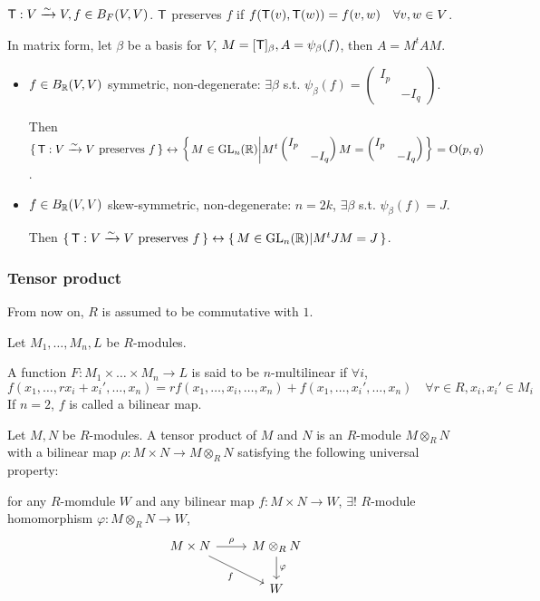 ${\sf T}: V \xrightarrow{\sim} V, f\in B_F(V, V)$.
${\sf T}$ preserves $f$ if $f({\sf T}(v), {\sf T}(w)) = f(v, w) \quad
\forall v,w \in V$.

In matrix form, let $\beta$ be a basis for $V$,
$M =[{\sf T}]_\beta, A = \psi_\beta(f)$, then $A = M^tAM$.

\begin{itemize}
  \item $f \in B_{\mathbb{R}}(V,V)$ symmetric, non-degenerate:
    $\exists \beta$ s.t. $\psi_\beta(f) = \begin{pmatrix}I_p \\ & -I_q\end{pmatrix}$.

    Then $\{\, {\sf T}: V \xrightarrow{\sim} V \text{~preserves~} f \,\} \leftrightarrow
    \left\{\,
      M \in \text{GL}_n(\mathbb{R}) \middle|
      M^t\begin{pmatrix}I_p \\ & -I_q\end{pmatrix}M = \begin{pmatrix}I_p \\ & -I_q\end{pmatrix}
      \,\right\} = \text{O}(p, q)$.
  \item $f \in B_{\mathbb{R}}(V,V)$ skew-symmetric, non-degenerate: $n = 2k$,
    $\exists \beta$ s.t. $\psi_\beta(f) = J$.

    Then $\{\, {\sf T}: V \xrightarrow{\sim} V \text{~preserves~} f \,\} \leftrightarrow
    \left\{\,
      M \in \text{GL}_n(\mathbb{R}) \middle|
      M^tJM = J
    \,\right\}$.
\end{itemize}

\subsubsection{Tensor product}
From now on, $R$ is assumed to be commutative with $1$.

\begin{definition}
Let $M_1, \dots, M_n, L$ be $R$-modules.

A function $F: M_1 \times \dots \times M_n \to L$ is said to be $n$-multilinear
if $\forall i$,
\[
  f(x_1, \dots, rx_i + x_i', \dots, x_n) =
  rf(x_1, \dots, x_i, \dots, x_n) + f(x_1, \dots, x_i', \dots, x_n)
  \quad \forall r \in R, x_i, x_i' \in M_i
\]
If $n = 2$, $f$ is called a bilinear map.
\end{definition}

\begin{definition}
  Let $M, N$ be $R$-modules. A tensor product of $M$ and $N$ is an $R$-module
  $M \otimes_R N$ with a bilinear map $\rho: M\times N \to M\otimes_R N$
  satisfying the following universal property:

  for any $R$-momdule $W$ and any bilinear map $f: M\times N \to W$,
  $\exists!$ $R$-module homomorphism $\varphi: M \otimes_R N \to W$,
  \[
    \begin{tikzcd}
    M\times N \arrow{r}{\rho} \arrow[swap]{dr}{f}
      & M \otimes_R N \arrow{d}{\varphi} \\
    & W
    \end{tikzcd}
  \]
\end{definition}

